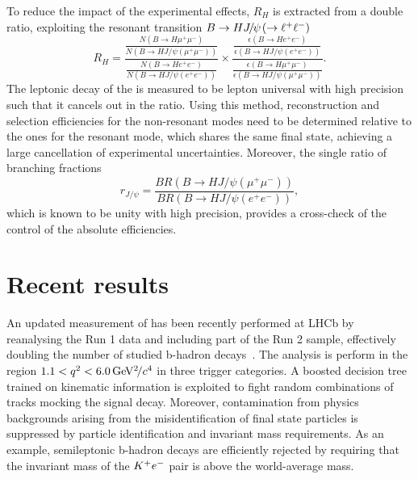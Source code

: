 \documentclass[a4paper,11pt]{article}
\begin{document}
To reduce the impact of the experimental effects, $R_H$ is extracted from a double ratio, exploiting the resonant transition $B \to H {{{J}\mskip -3mu/\mskip -2mu\psi\mskip 2mu}} (\to {\ensuremath{\ell^+}}{\ensuremath{\ell^-}})$
\begin{equation}
	R_{H} = \frac{\frac{N(B \to H \mu^+ \mu^-)}{N(B \to H J/\psi(\mu^+ \mu^-))}}
	{\frac{N(B \to H e^+ e^-)}{N(B \to H J/\psi(e^+ e^-))}}
	\times  \frac{\frac{\epsilon(B \to H e^+ e^-)}{\epsilon(B \to H J/\psi(e^+ e^-))}}
	{\frac{\epsilon(B \to H \mu^+ \mu^-)}{\epsilon(B \to H J/\psi(\mu^+ \mu^-))}
	}.
\end{equation}
The leptonic decay of the \jpsi is measured to be lepton universal with high precision~\cite{PDG} such that it cancels out in the ratio.
Using this method, reconstruction and selection efficiencies for the non-resonant modes need to be determined relative to the ones for the resonant mode, which shares the same final state, achieving a large cancellation of experimental uncertainties.
Moreover, the single ratio of branching fractions
\begin{equation}
	r_{J/\psi} = \frac{BR(B \to H J/\psi(\mu^+ \mu^-))}	{BR(B \to H J/\psi(e^+ e^-))},
\end{equation}
which is known to be unity with high precision, provides a cross-check of the control of the absolute efficiencies. 


\section{Recent results}

An updated measurement of \RK has been recently performed at LHCb by reanalysing the Run 1 data and including part of the Run 2 sample, 
effectively doubling the number of studied b-hadron decays~\cite{RKR2}.
The analysis is perform in the region $1.1<q^2<6.0 {\mathrm{\,Ge\kern -0.1em V^2\!/}c^4}$ in three trigger categories. 
A boosted decision tree trained on kinematic information is exploited to fight random combinations of tracks mocking the signal decay. 
Moreover, contamination from physics backgrounds arising from the misidentification of final state particles is suppressed by particle identification and invariant mass requirements. As an example, semileptonic b-hadron decays are efficiently rejected by requiring that the invariant mass of the ${{{K}}^+} e^-$ pair is above the world-average \Dz mass.
\end{document}
